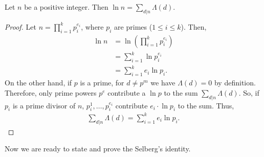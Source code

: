 \documentclass{subfile}
\begin{document}
	\begin{theorem}
		\label{thm:vonmangoldt}
		Let $n$ be a positive integer. Then $\ln n=\sum_{d|n}\Lambda(d)$.
	\end{theorem}
	
	\begin{proof}
		Let $n=\prod_{i=1}^kp_i^{e_i}$, where $p_i$ are primes ($1 \leq i \leq k$). Then,
			\begin{align*}
				\ln n  & =\ln\left(\prod_{i=1}^kp_i^{e_i}\right)\\
						&=\sum_{i=1}^k\ln{p_i^{e_i}}\\
						&=\sum_{i=1}^ke_i\ln p_i.
			\end{align*}
		On the other hand, if $p$ is a prime, for $d\neq p^m$ we have $\Lambda(d)=0$ by definition. Therefore, only prime powers $p^e$ contribute a $\ln p$ to the sum $\sum_{d|n}\Lambda(d)$. So, if $p_i$ is a prime divisor of $n$, $p_i^1,\ldots,p_i^{e_i}$ contribute $e_i \cdot \ln p_i$ to the sum. Thus,
			\begin{align*}
				\sum_{d|n}\Lambda(d) = \sum\limits_{i=1}^ke_i\ln p_i.
			\end{align*}
		
	\end{proof}
	Now we are ready to state and prove the Selberg's identity.
	
\end{document}
